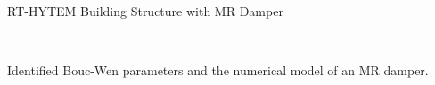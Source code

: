 \documentclass[usepdftitle=false]{beamer}
\begin{document}
\begin{frame}{RT-HYTEM Building Structure with MR Damper}
\begin{figure}[H]
\centering
\setcounter{subfigure}{0}
\\

\label{fig:8-13}
\end{figure}
Identified Bouc-Wen parameters and the numerical model of an MR damper.
\end{frame}
\end{document}
